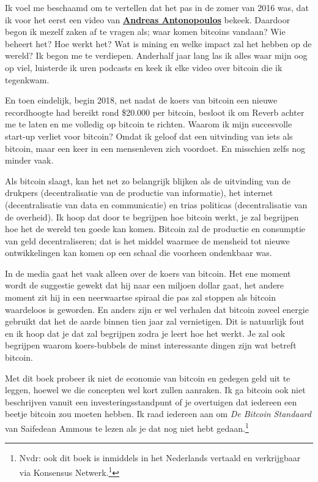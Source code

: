 \documentclass[smalldemyvopaper,11pt,twoside,onecolumn,openright,extrafontsizes]{memoir}
\begin{document}
Ik voel me beschaamd om te vertellen dat het pas in de zomer van 2016 was, dat ik voor het eerst een video van \href{https://www.youtube.com/channel/UCJWCJCWOxBYSi5DhCieLOLQ}{\textbf{Andreas Antonopoulos}} bekeek. Daardoor begon ik mezelf zaken af te vragen als; waar komen bitcoins vandaan? Wie beheert het? Hoe werkt het? Wat is mining en welke impact zal het hebben op de wereld? Ik begon me te verdiepen. Anderhalf jaar lang las ik alles waar mijn oog op viel, luisterde ik uren podcasts en keek ik elke video over bitcoin die ik tegenkwam.

En toen eindelijk, begin 2018, net nadat de koers van bitcoin een nieuwe recordhoogte had bereikt rond \$20.000 per bitcoin, besloot ik om Reverb achter me te laten en me volledig op bitcoin te richten. Waarom ik mijn succesvolle start-up verliet voor bitcoin? Omdat ik geloof dat een uitvinding van iets als bitcoin, maar een keer in een mensenleven zich voordoet. En misschien zelfs nog minder vaak.

Als bitcoin slaagt, kan het net zo belangrijk blijken als de uitvinding van de drukpers (decentralisatie van de productie van informatie), het internet (decentralisatie van data en communicatie) en trias politicas (decentralisatie van de overheid). Ik hoop dat door te begrijpen hoe bitcoin werkt, je zal begrijpen hoe het de wereld ten goede kan komen. Bitcoin zal de productie en consumptie van geld decentraliseren; dat is het middel waarmee de mensheid tot nieuwe ontwikkelingen kan komen op een schaal die voorheen ondenkbaar was.

In de media gaat het vaak alleen over de koers van bitcoin. Het ene moment wordt de suggestie gewekt dat hij naar een miljoen dollar gaat, het andere moment zit hij in een neerwaartse spiraal die pas zal stoppen als bitcoin waardeloos is geworden. En anders zijn er wel verhalen dat bitcoin zoveel energie gebruikt dat het de aarde binnen tien jaar zal vernietigen. Dit is natuurlijk fout en ik hoop dat je dat zal begrijpen zodra je leert hoe het werkt. Je zal ook begrijpen waarom koers-bubbels de minst interessante dingen zijn wat betreft bitcoin. 

Met dit boek probeer ik niet de economie van bitcoin en gedegen geld uit te leggen, hoewel we die concepten wel kort zullen aanraken. Ik ga bitcoin ook niet beschrijven vanuit een investeringsstandpunt of je overtuigen dat iedereen een beetje bitcoin zou moeten hebben. Ik raad iedereen aan om \textit{De Bitcoin Standaard} van Saifedean Ammous te lezen als je dat nog niet hebt gedaan.\footnote{Nvdr: ook dit boek is inmiddels in het Nederlands vertaald en verkrijgbaar via Konsensus Netwerk.\footnote{\url{https://konsensus.network/shop/}}}
\end{document}
